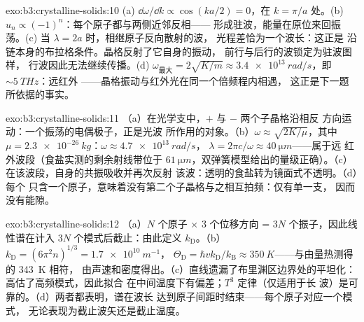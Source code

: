 \begin{solution}{exo:b3:crystalline-solids:10}
(a) $\dd\omega/\dd k \propto \cos(ka/2) = 0$，在 $k = \pi/a$ 处。(b)
$u_n \propto (-1)^n$：每个原子都与两侧近邻反相——
形成驻波，能量在原位来回振荡。(c)
当 $\lambda = 2a$ 时，相继原子反向散射的波，
光程差恰为一个波长：这正是
沿链本身的布拉格条件。晶格反射了它自身的振动，
前行与后行的波锁定为驻波图样，
行波因此无法继续传播。(d) $\omega_{\text{最大}} = 2\sqrt{K/m} \approx
\qty{3.4e13}{rad/s}$，即 $\sim\qty{5}{THz}$：远红外
——晶格振动与红外光在同一个倍频程内相遇，
这正是下一题所依据的事实。
\end{solution}

\begin{solution}{exo:b3:crystalline-solids:11}
（a）在光学支中，$+$ 与 $-$ 两个子晶格沿相反
方向运动：一个振荡的电偶极子，正是光波
所作用的对象。（b）$\omega \approx \sqrt{2K/\mu}$，其中 $\mu =
\qty{2.3e-26}{kg}$：$\omega \approx \qty{4.7e13}{rad/s}$，
$\lambda = 2\pi c/\omega \approx \qty{40}{\micro m}$——属于远
红外波段（食盐实测的剩余射线带位于
$\qty{61}{\micro m}$，双弹簧模型给出的量级正确）。（c）
在该波段，自身的共振吸收并再次反射
该波：透明的食盐转为镜面式不透明。（d）每个
只含一个原子，意味着没有第二个子晶格与之相互拍频：仅有单一支，
因而没有能隙。
\end{solution}

\begin{solution}{exo:b3:crystalline-solids:12}
（a）$N$ 个原子 $\times$ 3 个位移方向 = $3N$
个振子，因此线性谱在计入
$3N$ 个模式后截止：由此定义 $k_{\text{D}}$。（b）
$k_{\text{D}} = (6\pi^2n)^{1/3} = \qty{1.7e10}{m^{-1}}$，
$\Theta_{\text{D}} = \hbar vk_{\text{D}}/k_{\text{B}} \approx
\qty{350}{K}$——与由量热测得的 \qty{343}{K} 相符，
由声速和密度得出。（c）直线遗漏了布里渊区边界处的平坦化：
高估了高频模式，因此拟合
在中间温度下有偏差；$T^3$ 定律（仅适用于长
波）是可靠的。（d）两者都表明，谱在波长
达到原子间距时结束——每个原子对应一个模式，
无论表现为截止波矢还是截止温度。
\end{solution}

